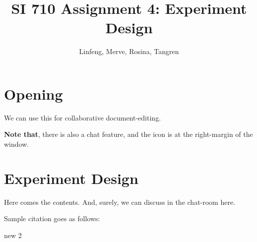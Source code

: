\documentclass{article}
\title{SI 710 Assignment 4: Experiment Design}
\author{Linfeng, Merve, Rosina, Tangren}
\date{}
\begin{document}
\maketitle

\section{Opening}%

We can use this for collaborative document-editing.

\textbf{Note that}, there is also a chat feature, and the icon is at the right-margin of the window.

\section{Experiment Design}

Here comes the contents. And, surely, we can discuss in the chat-room here.

Sample citation goes as follows: \cite{adams1995hitchhiker}

new 2



\end{document}

